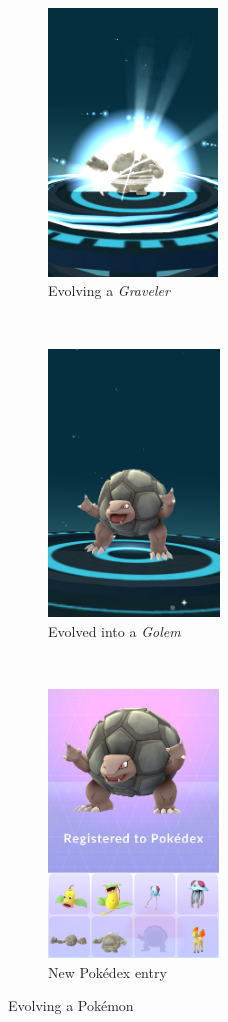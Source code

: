 \begin{figure}[h]
	\centering
	\begin{subfigure}[t]{0.3\textwidth}
		\centering
		\includegraphics[height=2.8in]{Figures/pogo-evolving-graveler}
		\caption{Evolving a \emph{Graveler}}
	\end{subfigure}
	~
	\begin{subfigure}[t]{0.3\textwidth}
		\centering
		\includegraphics[height=2.8in]{Figures/pogo-evolved-golem}
		\caption{Evolved into a \emph{Golem}}
	\end{subfigure}
	~
	\begin{subfigure}[t]{0.3\textwidth}
		\centering
		\includegraphics[height=2.8in]{Figures/pogo-new-poke}
		\caption{New Pokédex entry}
	\end{subfigure}
	\caption{Evolving a Pokémon}
\end{figure}


